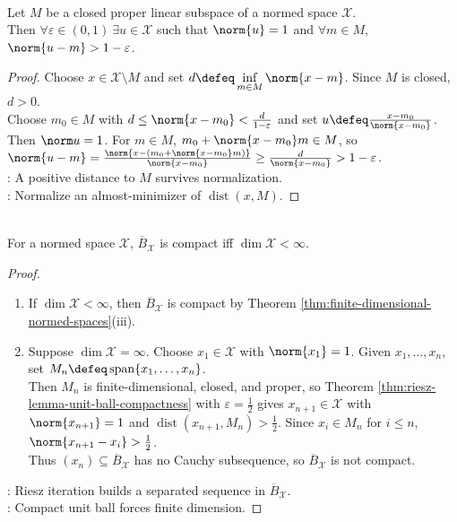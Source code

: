 \begin{theorem} \label{thm:riesz-lemma-unit-ball-compactness} \\
Let $M$ be a closed proper linear subspace of a normed space $\mathcal{X}$.\\
Then $\forall\varepsilon\in(0,1)\ \exists u\in\mathcal{X}$ such that $\norm{u}=1$ and $\forall m\in M$, $\norm{u-m}>1-\varepsilon$.
\begin{proof}
Choose $x\in\mathcal X\setminus M$ and set $d\defeq\inf\limits_{m\in M}\norm{x-m}$. Since $M$ is closed, $d>0$.\\
Choose $m_0\in M$ with $d\leq\norm{x-m_0}<\frac{d}{1-\varepsilon}$ and set $u\defeq\frac{x-m_0}{\norm{x-m_0}}$.\\
Then $\norm u=1$. For $m\in M$, $m_0+\norm{x-m_0}m\in M$, so $\norm{u-m}=\frac{\norm{x-(m_0+\norm{x-m_0}m)}}{\norm{x-m_0}}\geq\frac{d}{\norm{x-m_0}}>1-\varepsilon$.\\
: A positive distance to $M$ survives normalization.\\
: Normalize an almost-minimizer of $\operatorname{dist}(x,M)$.
\end{proof}
\end{theorem}

\begin{corollary} \label{cor:compact-unit-ball-finite-dimensional} \\
For a normed space $\mathcal{X}$, $\overline{B}_{\mathcal{X}}$ is compact iff $\dim\mathcal{X}<\infty$.
\begin{proof}
\begin{enumerate}[label=\roman*.]
\setlength{\itemsep}{0pt}
\item[$(\Leftarrow)$] If $\dim\mathcal X<\infty$, then $\overline B_{\mathcal X}$ is compact by Theorem \ref{thm:finite-dimensional-normed-spaces}(iii).
\item[$(\Rightarrow)$] Suppose $\dim\mathcal X=\infty$. Choose $x_1\in\mathcal X$ with $\norm{x_1}=1$. Given $x_1,\ldots,x_n$, set $M_n\defeq\operatorname{span}\{x_1,\ldots,x_n\}$.\\
Then $M_n$ is finite-dimensional, closed, and proper, so Theorem \ref{thm:riesz-lemma-unit-ball-compactness} with $\varepsilon=\frac{1}{2}$ gives $x_{n+1}\in\mathcal X$ with $\norm{x_{n+1}}=1$ and $\operatorname{dist}(x_{n+1},M_n)>\frac{1}{2}$. Since $x_i\in M_n$ for $i\leq n$, $\norm{x_{n+1}-x_i}>\frac{1}{2}$.\\
Thus $(x_n)\subseteq\overline B_{\mathcal X}$ has no Cauchy subsequence, so $\overline B_{\mathcal X}$ is not compact.
\end{enumerate}
: Riesz iteration builds a separated sequence in $\overline B_{\mathcal X}$.\\
: Compact unit ball forces finite dimension.
\end{proof}
\end{corollary}

